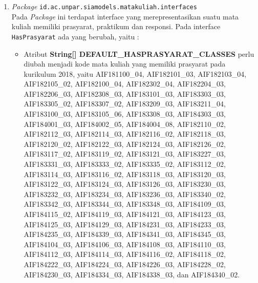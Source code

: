 \documentclass[a4paper,twoside]{article}
\begin{document}
\begin{enumerate}
\begin{enumerate}
\begin{enumerate}
				\item \textit{Package} \texttt{id.ac.unpar.siamodels.matakuliah.interfaces}\\
				Pada \textit{Package} ini terdapat interface yang merepresentasikan suatu mata kuliah memiliki prasyarat, praktikum dan responsi. Pada interface \texttt{HasPrasyarat} ada yang berubah, yaitu :
				\begin{itemize}
					\item Atribut \textbf{String[] DEFAULT\_HASPRASYARAT\_CLASSES} perlu diubah menjadi kode mata kuliah yang memiliki prasyarat pada kurikulum 2018, yaitu AIF181100\_04, AIF182101\_03,
					AIF182103\_04, AIF182105\_02, AIF182100\_04, AIF182302\_04,
					AIF182204\_03, AIF182206\_03, AIF182308\_03, AIF183101\_03,
					AIF183303\_03, AIF183305\_02, AIF183307\_02, AIF183209\_03,
					AIF183211\_04, AIF183100\_03, AIF183105\_06, AIF183308\_03,
					AIF184303\_03, AIF184001\_03, AIF184002\_05, AIF184004\_08,
					AIF182110\_02, AIF182112\_03, AIF182114\_03, AIF182116\_02,
					AIF182118\_03, AIF182120\_02, AIF182122\_03, AIF182124\_03,
					AIF182126\_02, AIF183117\_02,	AIF183119\_02, AIF183121\_03,
					AIF183227\_03, AIF183331\_03, AIF183333\_02, AIF183335\_02,
					AIF183112\_02, AIF183114\_03, AIF183116\_02, AIF183118\_03,
					AIF183120\_03, AIF183122\_03,	AIF183124\_03, AIF183126\_03,
					AIF183230\_03, AIF183232\_03, AIF183234\_03, AIF183236\_03,
					AIF183340\_02, AIF183342\_03, AIF183344\_03, AIF183348\_03,
					AIF184109\_03, AIF184115\_02,	AIF184119\_03, AIF184121\_03,
					AIF184123\_03, AIF184125\_03, AIF184129\_03, AIF184231\_03,
					AIF184233\_03, AIF184235\_03, AIF184339\_03, AIF184341\_03,
					AIF184345\_03, AIF184104\_03,	AIF184106\_03, AIF184108\_03,
					AIF184110\_03, AIF184112\_03, AIF184114\_03, AIF184116\_02,
					AIF184118\_02, AIF184222\_03, AIF184224\_03, AIF184226\_03,
					AIF184228\_02, AIF184230\_03,	AIF184334\_03, AIF184338\_03, dan AIF184340\_02.
				\end{itemize}
				

\end{enumerate}
\end{enumerate}
\end{enumerate}
\end{document}
